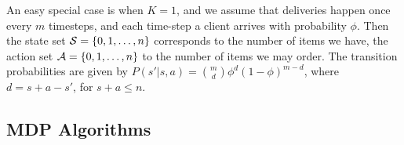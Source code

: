 An easy special case is when $K=1$, and we assume that deliveries
happen once every $m$ timesteps, and each time-step a client arrives
with probability $\phi$.  Then the state set ${\mathcal{S}}=\{0, 1, \ldots, n
\}$ corresponds to the number of items we have, the action set
${\mathcal{A}}=\{0, 1, \ldots, n\}$ to the number of items we may order.  The
transition probabilities are given by $P(s'|s,a) =
\binom{m}{d}\phi^d(1-\phi)^{m-d}$, where $d=s+a-s'$, for $s+a \leq n$.


\newcommand{\Node}[3]{%
  \pgfnodecircle{#1}[stroke]{#2}{0.3cm}%
  \pgfputat{\pgfrelative{#2}{\pgfxy(0,-.075)}}{\pgfbox[center,base]{#3}}}

\newcommand{\SNode}[3]{%
  \pgfnodebox{#1}[stroke]{#2}{0.3cm}%
  \pgfputat{\pgfrelative{#2}{\pgfxy(0,-.075)}}{\pgfbox[center,base]{#3}}}

\newcommand{\BNode}[3]{%
  \pgfnodecircle{#1}[stroke]{#2}{0.4cm}%
  \pgfputat{\pgfrelative{#2}{\pgfxy(0,-.075)}}{\pgfbox[center,base]{#3}}}

\newcommand{\Claim}[2]{%
  \pgfputat{\pgfrelative{\pgfxy(0.4,-0.075)}{\pgfnodecenter{#1}}}%
  {\pgfbox[left,base]{#2}}}

\newcommand{\LClaim}[2]{%
  \pgfputat{\pgfrelative{\pgfxy(-0.4,-0.075)}{\pgfnodecenter{#1}}}%
  {\pgfbox[right,base]{#2}}}

\newcommand{\Bush}[3]{%
  \pgfnodecircle{#1}[virtual]{\pgfrelative{\pgfnodecenter{#2}}{#3}}{1pt}%
  \pgfnodeconnline{#2}{#1}}



\subsection{MDP Algorithms}
\label{sec:mdp-algorithms}
